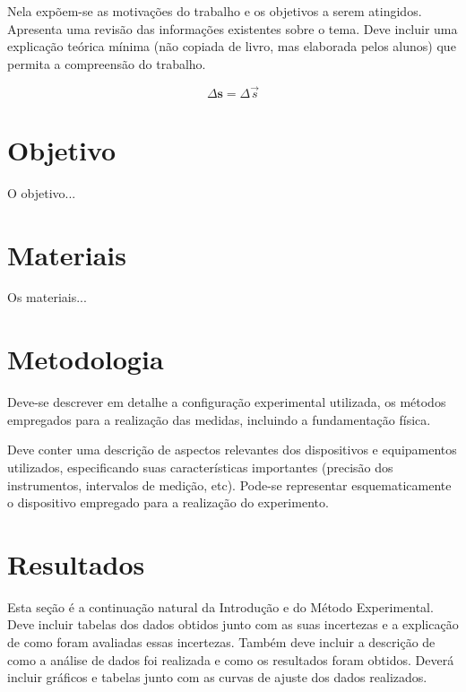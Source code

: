 \documentclass[a4paper]{article}
\begin{document}
Nela expõem-se as motivações do trabalho e os objetivos a serem atingidos. Apresenta uma revisão das informações existentes sobre o tema. Deve incluir uma explicação teórica mínima (não copiada de livro, mas elaborada pelos alunos) que permita a compreensão do trabalho.

\begin{equation}
    \Delta \textbf{s} = \Delta \vec{s}
\end{equation}

\section{Objetivo}
O objetivo...

\section{Materiais}
Os materiais...

\section{Metodologia}
Deve-se descrever em detalhe a configuração experimental utilizada, os métodos empregados para a realização das medidas, incluindo a fundamentação física.

Deve conter uma descrição de aspectos relevantes dos dispositivos e equipamentos utilizados, especificando suas características importantes (precisão dos instrumentos, intervalos de medição, etc). Pode-se representar esquematicamente o dispositivo empregado para a realização do experimento.

\section{Resultados}
Esta seção é a continuação natural da Introdução e do Método Experimental. Deve incluir tabelas dos dados obtidos junto com as suas incertezas e a explicação de como foram avaliadas essas incertezas. Também deve incluir a descrição de como a análise de dados foi realizada e como os resultados foram obtidos. Deverá incluir gráficos e tabelas junto com as curvas de ajuste dos dados realizados.
\end{document}
